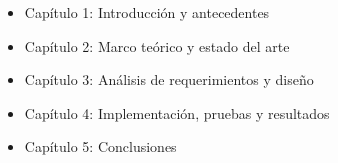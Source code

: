 
\begin{itemize}
    \item Capítulo 1: Introducción y antecedentes
    \item Capítulo 2: Marco teórico y estado del arte
    \item Capítulo 3: Análisis de requerimientos y diseño
    \item Capítulo 4: Implementación, pruebas y resultados
    \item Capítulo 5: Conclusiones
\end{itemize}
